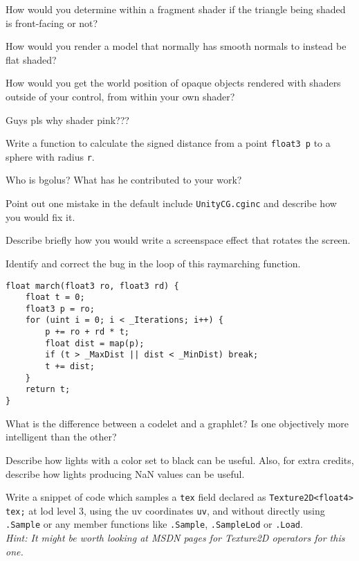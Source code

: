 \documentclass{exam}
\begin{document}
\begin{questions}
\question How would you determine within a fragment shader if the triangle being shaded is front-facing or not?
\vspace{100pt}

\question How would you render a model that normally has smooth normals to instead be flat shaded?
\vspace{100pt}

\question How would you get the world position of opaque objects rendered with shaders outside of your control, from within your own shader?
\vspace{100pt}

\question Guys pls why shader pink???
\vspace{100pt}

\question Write a function to calculate the signed distance from a point \texttt{float3 p} to a sphere with radius \texttt{r}.
\vspace{100pt}

\question Who is bgolus? What has he contributed to your work?
\vspace{100pt}

\question Point out one mistake in the default include \texttt{UnityCG.cginc} and describe how you would fix it.
\vspace{100pt}

\question Describe briefly how you would write a screenspace effect that rotates the screen.
\vspace{100pt}

\question Identify and correct the bug in the loop of this raymarching function.
\begin{verbatim}
float march(float3 ro, float3 rd) {
    float t = 0;
    float3 p = ro;
    for (uint i = 0; i < _Iterations; i++) {
        p += ro + rd * t;
        float dist = map(p);
        if (t > _MaxDist || dist < _MinDist) break;
        t += dist;
    }
    return t;
}
\end{verbatim}

\question What is the difference between a codelet and a graphlet? Is one objectively more intelligent than the other?
\vspace{100pt}

\question Describe how lights with a color set to black can be useful. Also, for extra credits, describe how lights producing NaN values can be useful.
\vspace{100pt}

\question Write a snippet of code which samples a \texttt{tex} field declared as \texttt{Texture2D<float4> tex;} at lod level 3, using the uv coordinates \texttt{uv}, and without directly using \texttt{.Sample} or any member functions like \texttt{.Sample}, \texttt{.SampleLod} or \texttt{.Load}.\\ \textit{Hint: It might be worth looking at MSDN pages for Texture2D operators for this one.}
\vspace{100pt}

\end{questions}
\end{document}
